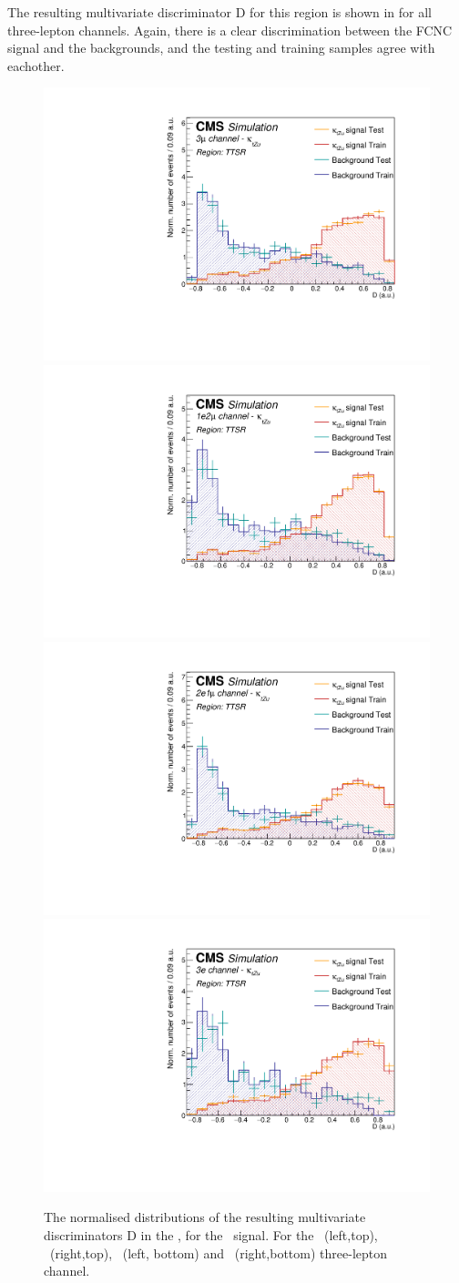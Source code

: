 \clearpage
The resulting multivariate discriminator D for this region is shown in  for all three-lepton channels. Again, there is a clear discrimination between the FCNC signal and the backgrounds, and the testing and training samples agree with eachother.
\begin{figure}[htbp]
	\centering
	\includegraphics[width=0.49\linewidth]{6_Search/Figures/PlotsTechnics/SigVsBkgTestZuttoppairuuu}
	\includegraphics[width=0.49\linewidth]{6_Search/Figures/PlotsTechnics/SigVsBkgTestZuttoppairuue}
	\includegraphics[width=0.49\linewidth]{6_Search/Figures/PlotsTechnics/SigVsBkgTestZuttoppaireeu}
	\includegraphics[width=0.49\linewidth]{6_Search/Figures/PlotsTechnics/SigVsBkgTestZuttoppaireee}
	\caption{The normalised distributions of the resulting  multivariate discriminators D in the \TTSR, for the \Zut\ signal. For the \mumumu\ (left,top), \emumu\ (right,top), \eemu\ (left, bottom) and \eee\ (right,bottom) three-lepton channel.}
	\label{fig:sigvsbkgtestzuttoppair}
\end{figure}

